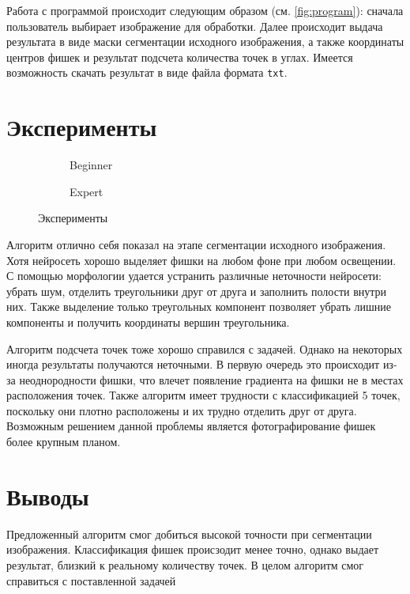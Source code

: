 \documentclass[11pt]{extarticle}
\begin{document}
Работа с программой происходит следующим образом (см. \autoref{fig:program}): сначала пользователь выбирает изображение для обработки.
Далее происходит выдача результата в виде маски сегментации исходного изображения, а также координаты центров фишек и результат подсчета количества точек в углах. Имеется возможность скачать результат в виде файла формата \verb|txt|.


\section{Эксперименты}

\begin{figure}[h]
  \centering
  \begin{subfigure}[b]{0.45\textwidth}
    
    \caption{Beginner}
  \end{subfigure}
  \begin{subfigure}[b]{0.45\textwidth}
    
    \caption{Expert}
  \end{subfigure}
  \caption{Эксперименты}
  \label{fig:exp}
\end{figure}

Алгоритм отлично себя показал на этапе сегментации исходного изображения. Хотя нейросеть хорошо выделяет фишки на любом фоне при любом освещении. С помощью морфологии удается устранить различные неточности нейросети: убрать шум, отделить треугольники друг от друга и заполнить полости внутри них. Также выделение только треугольных компонент позволяет убрать лишние компоненты и получить координаты вершин треугольника.

Алгоритм подсчета точек тоже хорошо справился с задачей. Однако на некоторых иногда результаты получаются неточными. В первую очередь это происходит из-за неоднородности фишки, что влечет появление градиента на фишки не в местах расположения точек. Также алгоритм имеет трудности с классификацией 5 точек, поскольку они плотно расположены и их трудно отделить друг от друга. Возможным решением данной проблемы является фотографирование фишек более крупным планом.

\section{Выводы}
Предложенный алгоритм смог добиться высокой точности при сегментации изображения. Классификация фишек происзодит менее точно, однако выдает результат, близкий к реальному количеству точек. В целом алгоритм смог справиться с поставленной задачей
\end{document}
